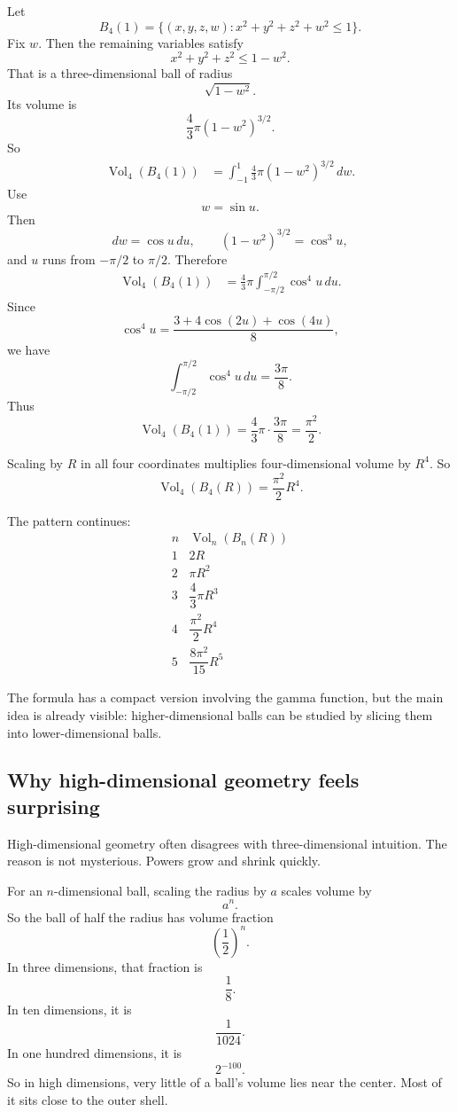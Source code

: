 Let
\[
    B_4(1)=
    \{(x,y,z,w):x^2+y^2+z^2+w^2\le1\}.
\]
Fix \(w\).  Then the remaining variables satisfy
\[
    x^2+y^2+z^2\le1-w^2.
\]
That is a three-dimensional ball of radius
\[
    \sqrt{1-w^2}.
\]
Its volume is
\[
    \frac43\pi(1-w^2)^{3/2}.
\]
So
\[
\begin{aligned}
\operatorname{Vol}_4(B_4(1))
&=
\int_{-1}^{1}
\frac43\pi(1-w^2)^{3/2}\,dw.
\end{aligned}
\]
Use
\[
    w=\sin u.
\]
Then
\[
    dw=\cos u\,du,
    \qquad
    (1-w^2)^{3/2}=\cos^3u,
\]
and \(u\) runs from \(-\pi/2\) to \(\pi/2\).  Therefore
\[
\begin{aligned}
\operatorname{Vol}_4(B_4(1))
&=
\frac43\pi
\int_{-\pi/2}^{\pi/2}\cos^4u\,du.
\end{aligned}
\]
Since
\[
    \cos^4u=\frac{3+4\cos(2u)+\cos(4u)}{8},
\]
we have
\[
    \int_{-\pi/2}^{\pi/2}\cos^4u\,du=\frac{3\pi}{8}.
\]
Thus
\[
\boxed{
    \operatorname{Vol}_4(B_4(1))
    =
    \frac43\pi\cdot\frac{3\pi}{8}
    =
    \frac{\pi^2}{2}.
}
\]

Scaling by \(R\) in all four coordinates multiplies four-dimensional volume by
\(R^4\).  So
\[
\boxed{
    \operatorname{Vol}_4(B_4(R))
    =
    \frac{\pi^2}{2}R^4.
}
\]

The pattern continues:
\[
\begin{array}{c|c}
n & \operatorname{Vol}_n(B_n(R)) \\ \hline
1 & 2R\\[1mm]
2 & \pi R^2\\[1mm]
3 & \dfrac43\pi R^3\\[2mm]
4 & \dfrac{\pi^2}{2}R^4\\[2mm]
5 & \dfrac{8\pi^2}{15}R^5
\end{array}
\]

The formula has a compact version involving the gamma function, but the main idea is
already visible: higher-dimensional balls can be studied by slicing them into
lower-dimensional balls.

\subsection{Why high-dimensional geometry feels surprising}

High-dimensional geometry often disagrees with three-dimensional intuition.  The
reason is not mysterious.  Powers grow and shrink quickly.

For an \(n\)-dimensional ball, scaling the radius by \(a\) scales volume by
\[
    a^n.
\]
So the ball of half the radius has volume fraction
\[
\boxed{
    \left(\frac12\right)^n.
}
\]
In three dimensions, that fraction is
\[
    \frac18.
\]
In ten dimensions, it is
\[
    \frac1{1024}.
\]
In one hundred dimensions, it is
\[
    2^{-100}.
\]
So in high dimensions, very little of a ball's volume lies near the center.  Most of it
sits close to the outer shell.

